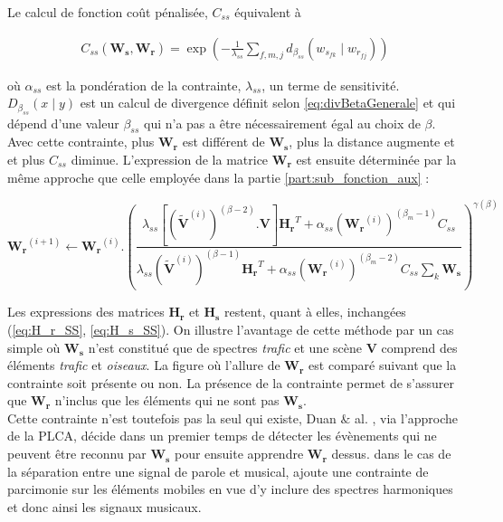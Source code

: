 Le calcul de fonction coût pénalisée, $C_{ss}$ équivalent à  

\begin{align}
C_{ss}(\mathbf{W_s},\mathbf{W_r}) = \exp\left(-\frac{1}{\lambda_{ss}}\sum_{f,m,j}d_{\beta_{ss}}(w_{s_{fk}} \mid w_{r_{fj}})\right)
\end{align}

où $\alpha_{ss}$ est la pondération de la contrainte, $\lambda_{ss}$, un terme de sensitivité. $D_{\beta_{ss}}(x \mid y)$ est un calcul de divergence définit selon \ref{eq:divBetaGenerale} et qui dépend d'une valeur $\beta_{ss}$ qui n'a pas a être nécessairement égal au choix de $\beta$. Avec cette contrainte, plus $\mathbf{W_r}$ est différent de $\mathbf{W_s}$, plus la distance augmente et et plus $C_{ss}$ diminue.  L'expression de la matrice $\mathbf{W_r}$ est ensuite déterminée par la même approche que celle employée dans la partie \ref{part:sub_fonction_aux} : 

\begin{equation}
\mathbf{W_r}^{(i+1)} \leftarrow \mathbf{W_r}^{(i)}.\left(\frac{\lambda_{ss}\left[\left(\mathbf{\tilde{V}}^{(i)} \right)^{(\beta-2)}.\mathbf{V} \right]\mathbf{H_r}^T+\alpha_{ss}\left(\mathbf{W_r}^{(i)}\right)^{(\beta_m-1)}C_{ss}}{\lambda_{ss}\left(\mathbf{\tilde{V}}^{(i)} \right)^{(\beta-1)}\mathbf{H_r}^T+\alpha_{ss}\left(\mathbf{W_r}^{(i)}\right)^{(\beta_m-2)}C_{ss}\sum_k \mathbf{W_s}} \right)^{\gamma(\beta)}
\end{equation}

Les expressions des matrices $\mathbf{H_r}$ et $\mathbf{H_s}$ restent, quant à elles, inchangées (\ref{eq:H_r_SS}, \ref{eq:H_s_SS}). On illustre l'avantage de cette méthode par un cas simple où $\mathbf{W_s}$ n'est constitué que de spectres \textit{trafic} et une scène $\mathbf{V}$ comprend des éléments \textit{trafic} et \textit{oiseaux}. La figure où l'allure de $\mathbf{W_r}$ est comparé suivant que la contrainte soit présente ou non. La présence de la contrainte permet de s'assurer que $\mathbf{W_r}$ n'inclus que les éléments qui ne sont pas $\mathbf{W_s}$.\\

Cette contrainte n'est toutefois pas la seul qui existe, Duan $\&$ al. \cite{duan_online_2012}, via l'approche de la PLCA, décide dans un premier temps de détecter les évènements qui ne peuvent être reconnu par $\mathbf{W_s}$ pour ensuite apprendre $\mathbf{W_r}$ dessus. \cite{} dans le cas de la séparation entre une signal de parole et musical, ajoute une contrainte de parcimonie sur les éléments mobiles en vue d'y inclure des spectres harmoniques et donc ainsi les signaux musicaux.
 




